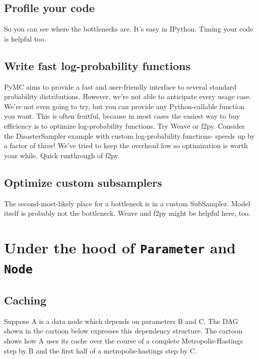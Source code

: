 \documentclass[]{book}
\begin{document}
\subsection{Profile your code}\label{sub:profile_your_code} %
So you can see where the bottlenecks are. It's easy in IPython. Timing your code is helpful too.

\subsection{Write fast log-probability functions}\label{sub:write_fast_log_probability_functions} %

PyMC aims to provide a fast and user-friendly interface to several standard probability distributions. However, we're not able to anticipate every usage case. We're not even going to try, but you can provide any Python-callable function you want. This is often fruitful, because in most cases the easiest way to buy efficiency is to optimize log-probability functions. Try Weave or f2py. Consider the DisasterSampler example with custom log-probability functions- speeds up by a factor of three! We've tried to keep the overhead low so optimization is worth your while. Quick runthrough of f2py.
\subsection{Optimize custom subsamplers}\label{sub:optimize_custom_subsamplers}
The second-most-likely place for a bottleneck is in a custom SubSampler. Model itself is probably not the bottleneck. Weave and f2py might be helpful here, too.

\section{Under the hood of \texttt{Parameter} and \texttt{Node}}\label{underhood} %

\subsection{Caching}\label{sub:caching}

Suppose A  is a data node which depends on parameters  B  and  C. The DAG shown in the cartoon below expresses this dependency structure. The cartoon shows how A uses its cache over the course of a complete Metropolis-Hastings step by B and the first half of a metropolis-hastings step by C. 
\end{document}
